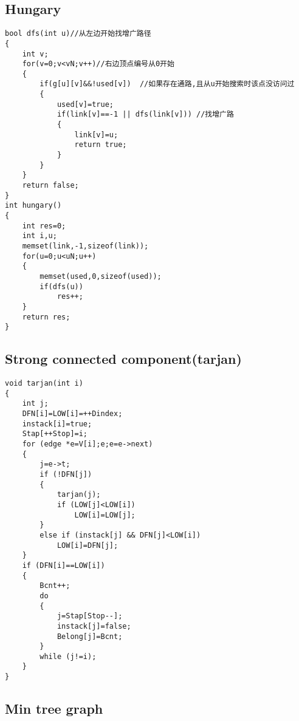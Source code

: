 \subsection{Hungary}
\begin{lstlisting}
bool dfs(int u)//从左边开始找增广路径
{
    int v;
    for(v=0;v<vN;v++)//右边顶点编号从0开始
	{
		if(g[u][v]&&!used[v])  //如果存在通路,且从u开始搜索时该点没访问过
		{
			used[v]=true;
			if(link[v]==-1 || dfs(link[v]))	//找增广路
			{
				link[v]=u;
				return true;
			}
		}
	}
    return false;
}
int hungary()
{
    int res=0;
    int i,u;
    memset(link,-1,sizeof(link));
    for(u=0;u<uN;u++)
    {
        memset(used,0,sizeof(used));
        if(dfs(u)) 
			res++;
    }
    return res;
} 
\end{lstlisting}
\subsection{Strong connected component(tarjan)}
\begin{lstlisting}
void tarjan(int i)
{
    int j;
    DFN[i]=LOW[i]=++Dindex;
    instack[i]=true;
    Stap[++Stop]=i;
    for (edge *e=V[i];e;e=e->next)
    {
        j=e->t;
        if (!DFN[j])
        {
            tarjan(j);
            if (LOW[j]<LOW[i])
                LOW[i]=LOW[j];
        }
        else if (instack[j] && DFN[j]<LOW[i])
            LOW[i]=DFN[j];
    }
    if (DFN[i]==LOW[i])
    {
        Bcnt++;
        do
        {
            j=Stap[Stop--];
            instack[j]=false;
            Belong[j]=Bcnt;
        }
        while (j!=i);
    }
}
\end{lstlisting}
\subsection{Min tree graph}
